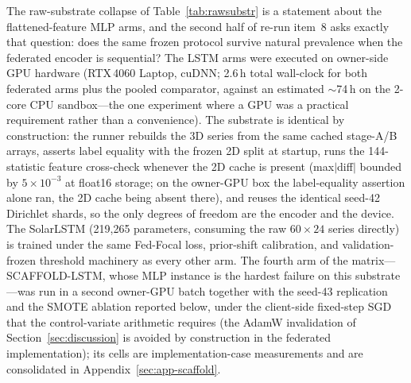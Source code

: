 The raw-substrate collapse of Table~\ref{tab:rawsubstr} is a
statement about the flattened-feature MLP arms, and the second half of
re-run item~8 asks exactly that question: does the same frozen
protocol survive natural prevalence when the federated encoder is
sequential? The LSTM arms were executed on owner-side GPU hardware
(RTX\,4060 Laptop, cuDNN; 2.6\,h total wall-clock for both
federated arms plus the pooled comparator, against an estimated
$\sim$74\,h on the 2-core CPU sandbox---the one experiment where a
GPU was a practical requirement rather than a convenience). The
substrate is identical by construction: the runner rebuilds the 3D
series from the same cached stage-A/B arrays, asserts label equality
with the frozen 2D split at startup, runs the 144-statistic feature
cross-check whenever the 2D cache is present (max$|$diff$|$ bounded
by $5\times10^{-3}$ at float16 storage; on the owner-GPU box the
label-equality assertion alone ran, the 2D cache being absent
there), and reuses the
identical seed-42 Dirichlet shards, so the only degrees of freedom
are the encoder and the device. The SolarLSTM (219,265 parameters,
consuming the raw $60\times24$ series directly) is trained under the
same Fed-Focal loss, prior-shift calibration, and validation-frozen
threshold machinery as every other arm. The fourth arm of the
matrix---SCAFFOLD-LSTM, whose MLP instance is the hardest failure
on this substrate---was run in a second owner-GPU batch together
with the seed-43 replication and the SMOTE ablation reported
below, under the client-side fixed-step SGD that the
control-variate arithmetic requires (the AdamW invalidation of
Section~\ref{sec:discussion} is avoided by construction in the
federated implementation); its cells are implementation-case
measurements and are consolidated in
Appendix~\ref{sec:app-scaffold}.

